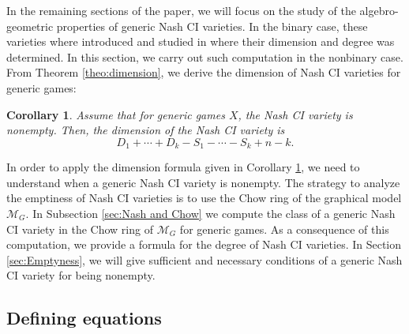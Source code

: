 \documentclass[11pt]{amsart}
\numberwithin{equation}{section}
\theoremstyle{plain}
\numberwithin{theorem}{section}
\newtheorem{corollary}[theorem]{Corollary}
\theoremstyle{definition}
\newcommand{\Mg}{{\mathcal M}_G}
\begin{document}
In the remaining sections of the paper, we will focus on the study of the algebro-geometric properties of generic Nash CI varieties.
In the binary case, these varieties where introduced and studied in \cite[Section 5]{portakal2024game} where their dimension and degree was determined. In this section, we carry out such computation in the nonbinary case.
From Theorem \ref{theo:dimension}, we derive the dimension of Nash CI varieties for generic games:

\begin{corollary}\label{cor:dim Nash}
    Assume that for generic games $X$, the Nash CI variety is nonempty. Then, the dimension of the Nash CI variety is 
    \[
    D_1+\cdots+D_k-S_1-\cdots-S_k+n-k.
    \]
\end{corollary}

In order to apply the dimension formula given in Corollary \ref{cor:dim Nash}, we need to understand when a generic Nash CI variety is nonempty. The strategy to analyze the emptiness of Nash CI varieties is to use the Chow ring of the graphical model $\Mg$. In Subsection \ref{sec:Nash and Chow} we compute the class of a generic Nash CI variety in the Chow ring of $\Mg$ for generic games. As a consequence of this computation, we provide a formula for the degree of Nash CI varieties. In Section \ref{sec:Emptyness}, we will give sufficient and necessary conditions of a generic Nash CI variety for being nonempty.

\subsection{Defining equations}\label{sec:equations}
\end{document}
